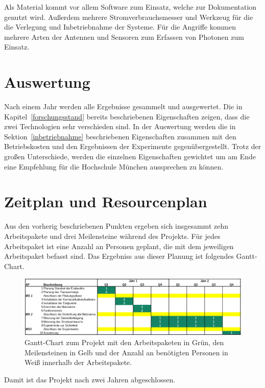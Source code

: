 Als Material kommt vor allem Software zum Einsatz, welche zur Dokumentation genutzt wird.
Außerdem mehrere Stromverbrauchsmesser und Werkzeug für die die Verlegung und Inbetriebnahme der Systeme.
Für die Angriffe kommen mehrere Arten der Antennen und Sensoren zum Erfassen von Photonen zum Einsatz.

\section{Auswertung}

Nach einem Jahr werden alle Ergebnisse gesammelt und ausgewertet.
Die in Kapitel~\ref{forschungsstand} bereits beschriebenen Eigenschaften zeigen, dass die zwei Technologien sehr verschieden sind.
In der Auswertung werden die in Sektion~\ref{inbetriebnahme} beschriebenen Eigenschaften zusammen mit den Betriebskosten und den Ergebnissen der Experimente gegenübergestellt.
Trotz der großen Unterschiede, werden die einzelnen Eigenschaften gewichtet um am Ende eine Empfehlung für die Hochschule München aussprechen zu können.

\section{Zeitplan und Resourcenplan}

Aus den vorherig beschriebenen Punkten ergeben sich insgesammt zehn Arbeitspakete und drei Meilensteine während des Projekts.
Für jedes Arbeitspaket ist eine Anzahl an Personen geplant, die mit dem jeweiligen Arbeitspaket befasst sind.
Das Ergebniss aus dieser Planung ist folgendes Gantt-Chart.

\begin{figure}[htbp] 
  \centering
     \includegraphics[width=1\textwidth]{img/gannt.png}
     \caption{Gantt-Chart zum Projekt mit den Arbeitspaketen in Grün, den Meilensteinen in Gelb und der Anzahl an benötigten Personen in Weiß innerhalb der Arbeitspakete.}
     \label{fig:gantt}
\end{figure}

Damit ist das Projekt nach zwei Jahren abgeschlossen.


